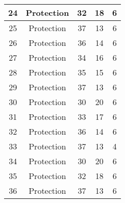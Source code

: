 \documentclass[results.tex]{subfiles}
\begin{document}
\begin{center}
\begin{tabular}{| c || c | c | c | c |}
            \hline
            24                      & Protection                   & 32                     & 18                      & 6                    \\
            \hline
            25                      & Protection                   & 37                     & 13                      & 6                    \\
            \hline
            26                      & Protection                   & 36                     & 14                      & 6                    \\
            \hline
            27                      & Protection                   & 34                     & 16                      & 6                    \\
            \hline
            28                      & Protection                   & 35                     & 15                      & 6                    \\
            \hline
            29                      & Protection                   & 37                     & 13                      & 6                    \\
            \hline
            30                      & Protection                   & 30                     & 20                      & 6                    \\
            \hline
            31                      & Protection                   & 33                     & 17                      & 6                    \\
            \hline
            32                      & Protection                   & 36                     & 14                      & 6                    \\
            \hline
            33                      & Protection                   & 37                     & 13                      & 4                    \\
            \hline
            34                      & Protection                   & 30                     & 20                      & 6                    \\
            \hline
            35                      & Protection                   & 32                     & 18                      & 6                    \\
            \hline
            36                      & Protection                   & 37                     & 13                      & 6                    \\

\end{tabular}
\end{center}
\end{document}
